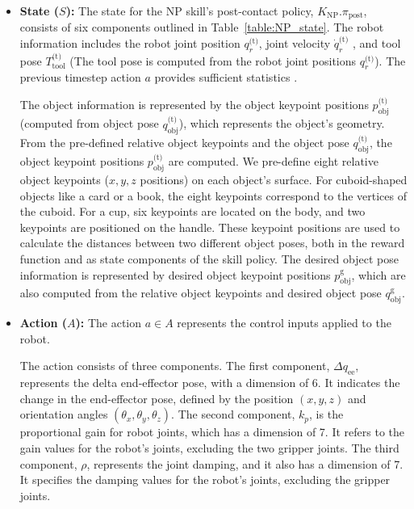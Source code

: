 \begin{itemize}
    \medskip
    \item \textbf{State (\( S \)):}    
    The state for the NP skill's post-contact policy, \( K_\text{NP}.\pi_\text{post} \), consists of six components outlined in Table~\ref{table:NP_state}.
    The robot information includes the robot joint position $q^\text{(t)}_r$, joint velocity $\dot{q}^\text{(t)}_r$ , and tool pose $T^\text{(t)}_\text{tool}$ (The tool pose is computed from the robot joint positions $q^\text{(t)}_r$). The previous timestep action $a$ provides sufficient statistics \cite{powell2012ai}. 
    
    The object information is represented by the object keypoint positions $p^\text{(t)}_\text{obj}$ (computed from object pose $q^\text{(t)}_\text{obj}$), which represents the object's geometry. From the pre-defined relative object keypoints and the object pose $q^\text{(t)}_\text{obj}$, the object keypoint positions $p^\text{(t)}_\text{obj}$ are computed. We pre-define eight relative object keypoints (\(x, y, z\) positions) on each object's surface. For cuboid-shaped objects like a card or a book, the eight keypoints correspond to the vertices of the cuboid. For a cup, six keypoints are located on the body, and two keypoints are positioned on the handle.
    These keypoint positions are used to calculate the distances between two different object poses, both in the reward function and as state components of the skill policy. The desired object pose information is represented by desired object keypoint positions $p^\text{g}_\text{obj}$, which are also computed from the relative object keypoints and desired object pose $q^\text{g}_\text{obj}$.

    \medskip
    \item \textbf{Action (\( A \)):} The action \( a \in A \) represents the control inputs applied to the robot.
    
    
    The action consists of three components. The first component, \( \Delta q_\text{ee} \), represents the delta end-effector pose, with a dimension of 6. It indicates the change in the end-effector pose, defined by the position \( (x, y, z) \) and orientation angles \( (\theta_{x}, \theta_{y}, \theta_{z}) \). The second component, \( k_p \), is the proportional gain for robot joints, which has a dimension of 7. It refers to the gain values for the robot's joints, excluding the two gripper joints. The third component, \( \rho \), represents the joint damping, and it also has a dimension of 7. It specifies the damping values for the robot's joints, excluding the gripper joints.


\end{itemize}
